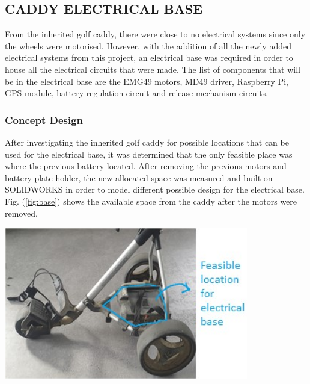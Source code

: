 \documentclass[11pt,landscape]{article}
\newenvironment{Figure}
  {\par\medskip\noindent\minipage{\linewidth}}
  {\endminipage\par\medskip}
\begin{document}
\newpage
\begin{multicols}{2}
    \subsection{CADDY ELECTRICAL BASE}
    From the inherited golf caddy, there were close to no electrical systems
    since only the wheels were motorised. However, with the addition of all the
    newly added electrical systems from this project, an electrical base was
    required in order to house all the electrical circuits that were made. The
    list of components that will be in the electrical base are the EMG49 motors,
    MD49 driver, Raspberry Pi, GPS module, battery regulation circuit and
    release mechanism circuits.
    
    \subsubsection{Concept Design}
    After investigating the inherited golf caddy for possible locations that can
    be used for the electrical base, it was determined that the only
    feasible place was where the previous battery located. After removing the
    previous motors and battery plate holder, the new allocated space was
    measured and built on SOLIDWORKS in order to model different possible design
    for the electrical base. Fig. (\ref{fig:base}) shows the available space
    from the caddy after the motors were removed.
    
    \begin{Figure}
        \begin{center}
            \includegraphics[width=0.8\textwidth]{Figure22.jpg}
            \label{fig:base}
        \end{center}
    \end{Figure}
    

\end{multicols}
\end{document}
